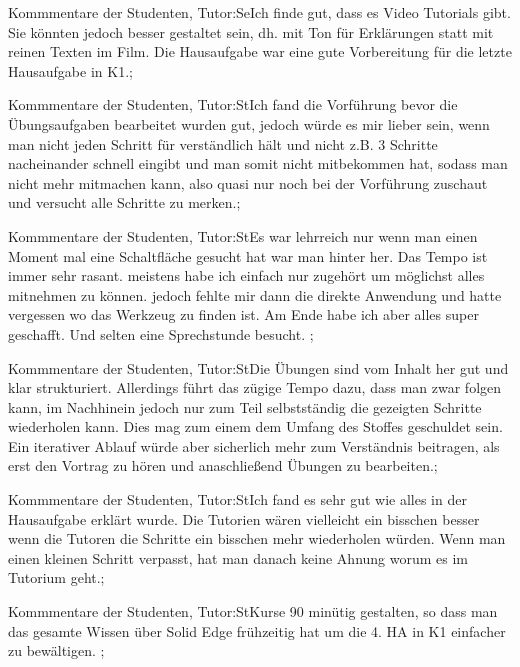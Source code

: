 \documentclass[10pt]{beamer}
\begin{document}
\begin{frame}[fragile]{Kommmentare der Studenten, Tutor:Se}Ich finde gut, dass es Video Tutorials gibt. Sie könnten jedoch besser gestaltet sein, dh. mit Ton für Erklärungen statt mit reinen Texten im Film. Die Hausaufgabe war eine gute Vorbereitung für die letzte Hausaufgabe in K1.;
 \end{frame}
\begin{frame}[fragile]{Kommmentare der Studenten, Tutor:St}Ich fand die Vorführung bevor die Übungsaufgaben bearbeitet wurden gut, jedoch würde es mir lieber sein, wenn man nicht jeden Schritt für verständlich hält und nicht z.B. 3 Schritte nacheinander schnell eingibt und man somit nicht mitbekommen hat, sodass man nicht mehr mitmachen kann, also quasi nur noch bei der Vorführung zuschaut und versucht alle Schritte zu merken.;
 \end{frame}
\begin{frame}[fragile]{Kommmentare der Studenten, Tutor:St}Es war lehrreich nur wenn man einen Moment mal eine Schaltfläche gesucht hat war man hinter her. Das Tempo ist immer sehr rasant. meistens habe ich einfach nur zugehört um möglichst alles mitnehmen zu können. jedoch fehlte mir dann die direkte Anwendung und hatte vergessen wo das Werkzeug zu finden ist.
 Am Ende habe ich aber alles super geschafft. Und selten eine Sprechstunde besucht.
 ;
 \end{frame}
\begin{frame}[fragile]{Kommmentare der Studenten, Tutor:St}Die Übungen sind vom Inhalt her gut und klar strukturiert. Allerdings führt das zügige Tempo dazu, dass man zwar folgen kann, im Nachhinein jedoch nur zum Teil selbstständig die gezeigten Schritte wiederholen kann. Dies mag zum einem dem Umfang des Stoffes geschuldet sein. Ein iterativer Ablauf würde aber sicherlich mehr zum Verständnis beitragen, als erst den Vortrag zu hören und anaschließend Übungen zu bearbeiten.;
 \end{frame}
\begin{frame}[fragile]{Kommmentare der Studenten, Tutor:St}Ich fand es sehr gut wie alles in der Hausaufgabe erklärt wurde. Die Tutorien wären vielleicht ein bisschen besser wenn die Tutoren die Schritte ein bisschen mehr wiederholen würden. Wenn man einen kleinen Schritt verpasst, hat man danach keine Ahnung worum es im Tutorium geht.;
 \end{frame}
\begin{frame}[fragile]{Kommmentare der Studenten, Tutor:St}Kurse 90 minütig gestalten, so dass man das gesamte Wissen über Solid Edge frühzeitig hat um die 4. HA in K1 einfacher zu bewältigen.  ;
 \end{frame}
\end{document}
